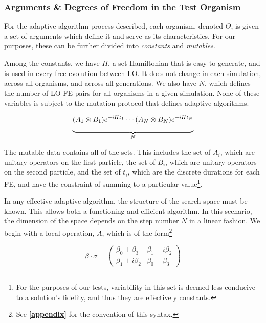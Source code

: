 \documentclass[11pt,twocolumn]{article}
\newcommand*\mystrut[1]{\vrule width0pt height0pt depth#1\relax}
\begin{document}
	\subsubsection{Arguments \& Degrees of Freedom in the Test Organism} \label{arg}

	For the adaptive algorithm process described, each organism, denoted $\Theta$, is given a set of arguments which define it and serve as its characteristics. For our purposes, these can be further divided into \emph{constants} and \emph{mutables}. 

	Among the constants, we have $H$, a set Hamiltonian that is easy to generate, and is used in every free evolution between LO. It does not change in each simulation, across all organisms, and across all generations. We also have $N$, which defines the number of LO-FE pairs for all organisms in a given simulation. None of these variables is subject to the mutation protocol that defines adaptive algorithms. 

	\begin{equation} \label{listEq}
		\underbrace{\mystrut{2.5ex} (A_1\otimes B_1)e^{-i H t_1}\cdots(A_{N}\otimes B_{N})e^{-i H t_{N}}}_{N}
	\end{equation}

	The mutable data contains all of the sets. This includes the set of $A_i$, which are unitary operators on the first particle, the set of $B_i$, which are unitary operators on the second particle, and the set of $t_i$, which are the discrete durations for each FE, and have the constraint of summing to a particular value\footnote{For the purposes of our tests, variability in this set is deemed less conducive to a solution's fidelity, and thus they are effectively constants.}. 

	In any effective adaptive algorithm, the structure of the search space must be known. This allows both a functioning and efficient algorithm. In this scenario, the dimension of the space depends on the step number $N$ in a linear fashion. We begin with a local operation, $A$, which is of the form\footnote{See \textbf{\ref{appendix}} for the convention of this syntax.}

	\begin{equation}
		\beta \cdot \sigma 
		= 
		\begin{pmatrix}
			\beta_0 + \beta_3    &    \beta_1 - i \beta_2\\[3mm]
			\beta_1 + i \beta_2  &    \beta_0 - \beta_3
		\end{pmatrix}
	\end{equation}
\end{document}
